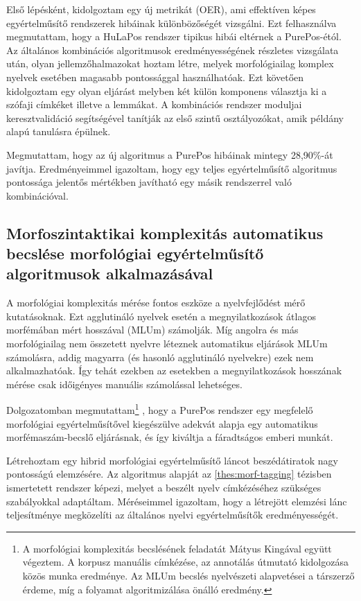 Első lépésként, kidolgoztam egy új metrikát (OER), ami effektíven képes egyértelműsítő rendszerek hibáinak különbözőségét vizsgálni. 
Ezt felhasználva megmutattam, hogy a HuLaPos rendszer tipikus hibái eltérnek a PurePos-étól. 
Az általános kombinációs algoritmusok eredményességének részletes vizsgálata után, olyan jellemzőhalmazokat hoztam létre, melyek morfológiailag komplex nyelvek esetében magasabb pontossággal használhatóak.
Ezt követően kidolgoztam egy olyan eljárást melyben két külön komponens választja ki a szófaji címkéket illetve a lemmákat. 
A kombinációs rendszer moduljai keresztvalidáció segítségével tanítják az első szintű osztályozókat, amik példány alapú tanulásra épülnek.

Megmutattam, hogy az új algoritmus a PurePos hibáinak mintegy 28,90\%-át javítja. 
Eredményeimmel igazoltam, hogy egy teljes egyértelműsítő algoritmus pontossága jelentős mértékben javítható egy másik rendszerrel való kombinációval. 

\subsection{Morfoszintaktikai komplexitás automatikus becslése morfológiai egyértelműsítő algoritmusok alkalmazásával}
\label{thes:mlu}

A morfológiai komplexitás mérése fontos eszköze a nyelvfejlődést mérő kutatásoknak.
Ezt agglutináló nyelvek esetén a megnyilatkozások átlagos morfémában mért hosszával (MLUm) számolják.
Míg angolra és más morfológiailag nem összetett nyelvre léteznek automatikus eljárások MLUm számolásra, 
addig magyarra (és hasonló agglutináló nyelvekre) ezek nem alkalmazhatóak. 
Így tehát ezekben az esetekben a megnyilatkozások hosszának mérése csak időigényes manuális számolással lehetséges.

Dolgozatomban megmutattam\footnote{A morfológiai komplexitás becslésének feladatát Mátyus Kingával együtt végeztem. A korpusz manuális címkézése, az annotálás útmutató kidolgozása közös munka eredménye. Az MLUm becslés nyelvészeti alapvetései a társzerző érdeme, míg a folyamat algoritmizálása önálló eredmény.}
, hogy a PurePos rendszer egy megfelelő morfológiai egyértelműsítővel kiegészülve adekvát alapja egy automatikus morfémaszám-becslő eljárásnak, és így kiváltja a fáradtságos emberi munkát. 

\begin{core}
\begin{thesis}
\label{thes:spoken-morf-tagging}
Létrehoztam egy  hibrid morfológiai egyértelműsítő láncot beszédátiratok nagy pontosságú elemzésére. 
Az algoritmus alapját az \ref{thes:morf-tagging} tézisben ismertetett rendszer képezi, melyet a beszélt nyelv címkézéséhez szükséges szabályokkal adaptáltam. 
Méréseimmel igazoltam, hogy a létrejött elemzési lánc teljesítménye megközelíti az általános nyelvi egyértelműsítők eredményességét.
\end{thesis}

\begin{pub}
\cite{Matyus2014,Orosz2014c}
\end{pub}
\end{core}

